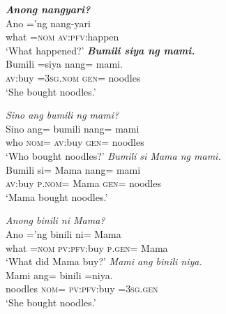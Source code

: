 \documentclass[output=paper]{langsci/langscibook}
\begin{document}
\begin{exe}
	\ex\label{i}
	\begin{xlist}
		 \textit{\textbf{Anong nangyari?}}\\
		\gll Ano  =’ng  nang-yari{\USQMark}\\
		what  =\textsc{nom}  \textsc{av}:\textsc{pfv}:happen\\
		\glt ‘What happened?’
		  \textit{\textbf{Bumili siya ng mami.}}\\
		\gll B{\USSmaller}um{\USGreater}ili  =siya    nang=  mami.  \\
		\textsc{av}:buy    =\textsc{3sg}.\textsc{nom} \textsc{gen}=  noodles\\
		\glt ‘She bought noodles.’
	\end{xlist}
\end{exe}

\begin{exe}
	\ex\label{j}
	\begin{xlist}
		 \textit{Sino ang bumili ng mami?}\\
		\gll Sino  ang=  b{\USSmaller}um{\USGreater}ili  nang=  mami{\USQMark}\\
		who  \textsc{nom}=  \textsc{av}:buy    \textsc{gen}=  noodles\\
		\glt ‘Who bought noodles?’
		  \textit{Bumili si Mama ng mami.}\\
		\gll B{\USSmaller}um{\USGreater}ili  si=    Mama  nang=  mami{\USQMark}\\
		\textsc{av}:buy  \textsc{p}.\textsc{nom}=  Mama  \textsc{gen}=  noodles\\
		\glt ‘Mama bought noodles.’
	\end{xlist}
\end{exe}

\begin{exe}
	\ex\label{k}
	\begin{xlist}
		 \textit{Anong binili ni Mama?}\\
		\gll Ano  =’ng  b{\USSmaller}in{\USGreater}ili  ni=  Mama{\USQMark}\\
		what  =\textsc{nom}  \textsc{pv}:\textsc{pfv}:buy  \textsc{p}.\textsc{gen}=  Mama\\
		\glt ‘What did Mama buy?’
		  \textit{Mami ang binili niya.}\\
		\gll Mami    ang=  b{\USSmaller}in{\USGreater}ili  =niya.\\
		noodles  \textsc{nom}=  \textsc{pv}:\textsc{pfv}:buy  =\textsc{3sg}.\textsc{gen}\\
		\glt ‘She bought noodles.’
	\end{xlist}
\end{exe}
\end{document}
